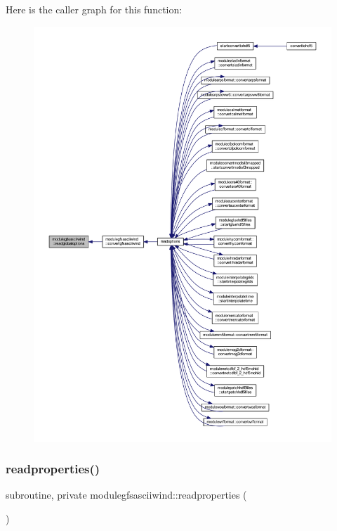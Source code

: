 Here is the caller graph for this function\+:\nopagebreak
\begin{figure}[H]
\begin{center}
\leavevmode
\includegraphics[width=350pt]{namespacemodulegfsasciiwind_a8c3d7b7c4a1b9cba9c41386d4584b037_icgraph}
\end{center}
\end{figure}
\mbox{\label{namespacemodulegfsasciiwind_a59e80d4f0ead06a644744e644d4504a0}} 
\subsubsection{\texorpdfstring{readproperties()}{readproperties()}}
{\footnotesize\ttfamily subroutine, private modulegfsasciiwind\+::readproperties (\begin{DoxyParamCaption}{ }\end{DoxyParamCaption})\hspace{0.3cm}{\ttfamily [private]}}

